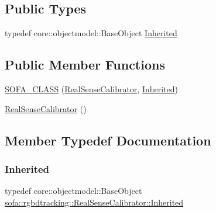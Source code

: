 \subsection*{Public Types}
\begin{DoxyCompactItemize}
\item 
typedef core\+::objectmodel\+::\+Base\+Object \hyperlink{classsofa_1_1rgbdtracking_1_1_real_sense_calibrator_af5eef0eeea5daa52e920b9d29e5575dc}{Inherited}
\end{DoxyCompactItemize}
\subsection*{Public Member Functions}
\begin{DoxyCompactItemize}
\item 
\hyperlink{classsofa_1_1rgbdtracking_1_1_real_sense_calibrator_a65aec8ab1fa6f8bda1ed0b496d818522}{S\+O\+F\+A\+\_\+\+C\+L\+A\+SS} (\hyperlink{classsofa_1_1rgbdtracking_1_1_real_sense_calibrator}{Real\+Sense\+Calibrator}, \hyperlink{classsofa_1_1rgbdtracking_1_1_real_sense_calibrator_af5eef0eeea5daa52e920b9d29e5575dc}{Inherited})
\item 
\hyperlink{classsofa_1_1rgbdtracking_1_1_real_sense_calibrator_a4f171363d7cde684d2f84db2dcf0efe7}{Real\+Sense\+Calibrator} ()
\end{DoxyCompactItemize}


\subsection{Member Typedef Documentation}
\mbox{\label{classsofa_1_1rgbdtracking_1_1_real_sense_calibrator_af5eef0eeea5daa52e920b9d29e5575dc}} 
\subsubsection{\texorpdfstring{Inherited}{Inherited}}
{\footnotesize\ttfamily typedef core\+::objectmodel\+::\+Base\+Object \hyperlink{classsofa_1_1rgbdtracking_1_1_real_sense_calibrator_af5eef0eeea5daa52e920b9d29e5575dc}{sofa\+::rgbdtracking\+::\+Real\+Sense\+Calibrator\+::\+Inherited}}



